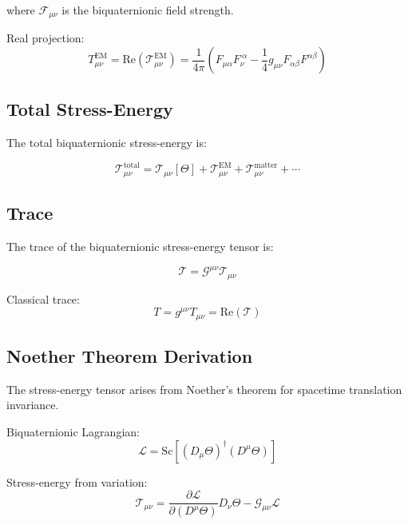 where $\mathcal{F}_{\mu\nu}$ is the biquaternionic field strength.

Real projection:
\begin{equation}
T_{\mu\nu}^{\text{EM}} = \text{Re}(\mathcal{T}_{\mu\nu}^{\text{EM}}) = \frac{1}{4\pi}\left(F_{\mu\alpha}F_\nu^{\ \alpha} - \frac{1}{4}g_{\mu\nu}F_{\alpha\beta}F^{\alpha\beta}\right)
\end{equation}

\subsection{Total Stress-Energy}

The total biquaternionic stress-energy is:

\begin{equation}
\mathcal{T}_{\mu\nu}^{\text{total}} = \mathcal{T}_{\mu\nu}[\Theta] + \mathcal{T}_{\mu\nu}^{\text{EM}} + \mathcal{T}_{\mu\nu}^{\text{matter}} + \cdots
\end{equation}

\subsection{Trace}

The trace of the biquaternionic stress-energy tensor is:

\begin{equation}
\mathcal{T} = \mathcal{G}^{\mu\nu} \mathcal{T}_{\mu\nu}
\end{equation}

Classical trace:
\begin{equation}
T = g^{\mu\nu} T_{\mu\nu} = \text{Re}(\mathcal{T})
\end{equation}

\subsection{Noether Theorem Derivation}

The stress-energy tensor arises from Noether's theorem for spacetime translation invariance.

Biquaternionic Lagrangian:
\begin{equation}
\mathcal{L} = \text{Sc}[(D_\mu \Theta)^\dagger (D^\mu \Theta)]
\end{equation}

Stress-energy from variation:
\begin{equation}
\mathcal{T}_{\mu\nu} = \frac{\partial \mathcal{L}}{\partial (D^\mu \Theta)} D_\nu \Theta - \mathcal{G}_{\mu\nu} \mathcal{L}
\end{equation}

